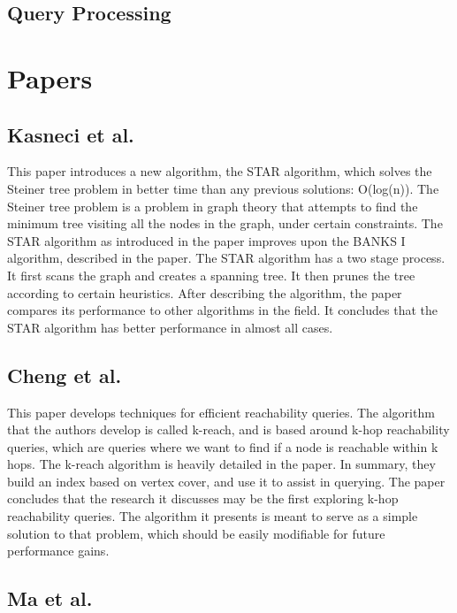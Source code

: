 \documentclass[11pt]{article}
\begin{document}
\subsection{Query Processing}

\section{Papers}

\subsection{Kasneci et al.}

This paper\cite{Star} introduces a new algorithm, the STAR algorithm, which solves the Steiner tree problem in better time than any previous solutions: O(log(n)). The Steiner tree problem is a problem in graph theory that attempts to find the minimum tree visiting all the nodes in the graph, under certain constraints. The STAR algorithm as introduced in the paper improves upon the BANKS I algorithm, described in the paper. The STAR algorithm has a two stage process. It first scans the graph and creates a spanning tree. It then prunes the tree according to certain heuristics. After describing the algorithm, the paper compares its performance to other algorithms in the field. It concludes that the STAR algorithm has better performance in almost all cases.

\subsection{Cheng et al.}

This paper\cite{Cheng} develops techniques for efficient reachability queries. The algorithm that the authors develop is called k-reach, and is based around k-hop reachability queries, which are queries where we want to find if a node is reachable within k hops. The k-reach algorithm is heavily detailed in the paper. In summary, they build an index based on vertex cover, and use it to assist in querying. The paper concludes that the research it discusses may be the first exploring k-hop reachability queries. The algorithm it presents is meant to serve as a simple solution to that problem, which should be easily modifiable for future performance gains.

\subsection{Ma et al.}
\end{document}
